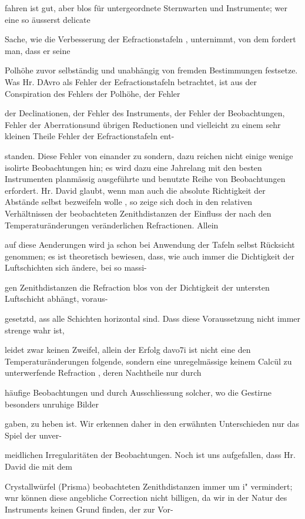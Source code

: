 \documentclass[10pt,a4paper]{article}
\begin{document}
fahren ist gut, aber blos für untergeordnete Sternwarten und Instrumente; wer eine so äusserst delicate

Sache, wie die Verbesserung der Eefractionstafeln , unternimmt, von dem fordert man, dass er seine

Polhöhe zuvor selbständig und unabhängig von fremden Bestimmungen festsetze. Was Hr. DAvro als Fehler der Eefractionstafeln betrachtet, ist aus der Conspiration des Fehlers der Polhöhe, der Fehler

der Declinationen, der Fehler des Instruments, der Fehler der Beobachtungen, Fehler der Aberrationsund übrigen Reductionen und vielleicht zu einem sehr kleinen Theile Fehler der Eefractionstafeln ent-

standen. Diese Fehler von einander zu sondern, dazu reichen nicht einige wenige isolirte Beobachtungen hin; es wird dazu eine Jahrelang mit den besten Instrumenten planmässig ausgeführte und benutzte Reihe von Beobachtungen erfordert. Hr. David glaubt, wenn man auch die absolute Richtigkeit der Abstände selbst bezweifeln wolle , so zeige sich doch in den relativen Verhältnissen der beobachteten Zenithdistanzen der Einfluss der nach den Temperaturänderungen veränderlichen Refractionen. Allein

auf diese Aenderungen wird ja schon bei Anwendung der Tafeln selbst Rücksicht genommen; es ist theoretisch bewiesen, dass, wie auch immer die Dichtigkeit der Luftschichten sich ändere, bei so massi-

gen Zenithdistanzen die Refraction blos von der Dichtigkeit der untersten Luftschicht abhängt, voraus-

gesetztd, ass alle Schichten horizontal sind. Dass diese Voraussetzung nicht immer strenge wahr ist,

leidet zwar keinen Zweifel, allein der Erfolg davo7i ist nicht eine den Temperaturänderungen folgende, sondern eine unregelmässige keinem Calcül zu unterwerfende Refraction , deren Nachtheile nur durch

häufige Beobachtungen und durch Ausschliessung solcher, wo die Gestirne besonders unruhige Bilder

gaben, zu heben ist. Wir erkennen daher in den erwähnten Unterschieden nur das Spiel der unver-

meidlichen Irregularitäten der Beobachtungen. Noch ist uns aufgefallen, dass Hr. David die mit dem

Crystallwürfel (Prisma) beobachteten Zenithdistanzen immer um i" vermindert; wnr können diese angebliche Correction nicht billigen, da wir in der Natur des Instruments keinen Grund finden, der zur Vor-
\end{document}
